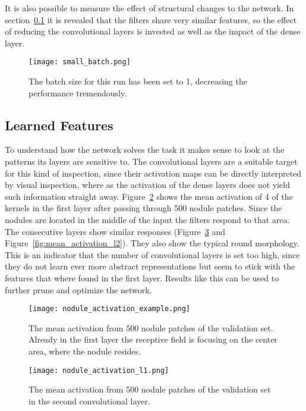 \documentclass[main.tex]{subfiles}
\begin{document}
It is also possible to measure the effect of structural changes to the network. In section~\ref{ss:features} it is revealed that the filters share very similar features, so the effect of reducing the convolutional layers is invested as well as the impact of the dense layer.

\begin{figure}[H]
\begin{center}
\texttt{[image: small\_batch.png]}
\end{center}
\caption{The batch size for this run has been set to 1, decreasing the performance tremendously.}
\label{fig:small_batch}
\end{figure}


\subsection{Learned Features}\label{ss:features}
To understand how the network solves the task it makes sense to look at the patterns its layers are sensitive to. The convolutional layers are a suitable target for this kind of inspection, since their activation maps can be directly interpreted by visual inspection, where as the activation of the dense layers does not yield such information straight away. Figure~\ref{fig:mean_activation} shows the mean activation of 4 of the kernels in the first layer after passing through 500 nodule patches. Since the nodules are located in the middle of the input the filters respond to that area. The consecutive layers show similar responses (Figure~\ref{fig:mean_activation_l1} and Figure~\ref{fig:mean_activation_l2}). They also show the typical round morphology. This is an indicator that the number of convolutional layers is set too high, since they do not learn ever more abstract representations but seem to stick with the features that where found in the first layer. Results like this can be used to further prune and optimize the network.


\begin{figure}[H]
\begin{center}
\texttt{[image: nodule\_activation\_example.png]}
\end{center}
\caption{The mean activation from 500 nodule patches of the validation set. Already in the first layer the receptive field is focusing on the center area, where the nodule resides.}
\label{fig:mean_activation}
\end{figure}

\begin{figure}
\begin{center}
\texttt{[image: nodule\_activation\_l1.png]}
\end{center}
\caption{The mean activation from 500 nodule patches of the validation set in the second convolutional layer.}
\label{fig:mean_activation_l1}
\end{figure}
\end{document}
